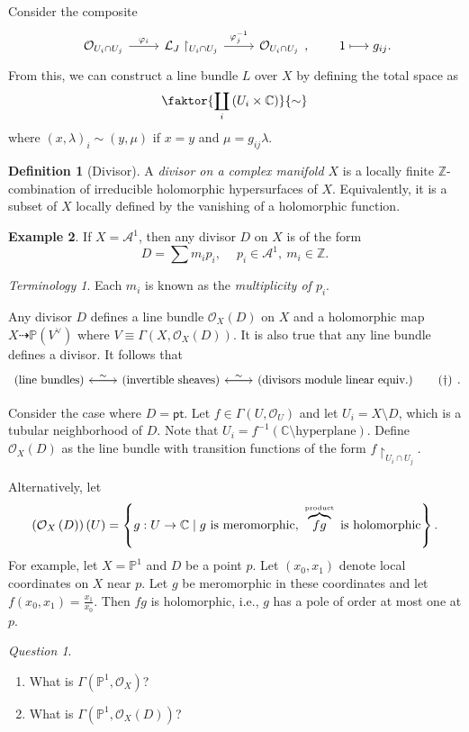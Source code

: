 \documentclass[10pt,letterpaper,cm]{nupset}
\theoremstyle{definition}
\newtheorem{defn}{Definition}[subsection]
\newtheorem{exmp}[defn]{Example}
\theoremstyle{theorem}
\theoremstyle{remark}
\newtheorem*{question}{Question}
\newtheorem*{term}{Terminology}
\newcommand{\A}{\mathcal A}
\newcommand{\C}{\mathbb C}
\renewcommand{\L}{\mathcal L}
\renewcommand{\O}{\mathcal O}
\renewcommand{\P}{\mathbb P}
\newcommand{\Z}{\mathbb Z}
\newcommand{\1}{\mathbb{1}}
\newcommand{\0}{\vec 0}
\newcommand{\pt}{\mathsf{pt}}
\newcommand{\be}{\begin{enumerate}}
\newcommand{\ee}{\end{enumerate}}
\begin{document}
Consider the composite
\[
\begin{tikzcd}
\O_{U_i \cap U_j} \arrow[r, "\varphi_i"] & \L_J\restriction_{U_i \cap U_j} \arrow[r, "\varphi_j^{-1}"] & \O_{U_i \cap U_j}
\end{tikzcd}
, \ \quad \quad 1 \longmapsto g_{ij}.
\] From this, we can construct a line bundle $L$ over $X$ by defining the total space as 
\[
\faktor{\coprod_i\left(U_i \times \C\right)}{\sim}
\] where $\left(x, \lambda \right)_i \sim \left(y, \mu\right)$ if $x=y$ and $\mu = g_{ij}\lambda$. 

\medskip

\begin{defn}[Divisor]
A \textit{divisor on a complex manifold $X$} is a locally finite $\Z$-combination of irreducible holomorphic hypersurfaces of $X$. Equivalently, it is a subset of $X$ locally defined  by the vanishing of a holomorphic function.
\end{defn}

\begin{exmp}
If $X = \A^1$, then any divisor $D$ on $X$ is of the form $$D = \sum m_ip_i, \ \quad p_i \in \A^1, \ m_i \in \Z.$$ 
\end{exmp}

\begin{term}
Each $m_i$ is known as the \textit{multiplicity of $p_i$}.
\end{term}

Any divisor $D$ defines a line bundle $\O_X(D)$ on $X$ and a holomorphic map $X \dashrightarrow \P\left(V^{\vee}\right)$ where $V\equiv \Gamma\left(X, \O_X(D)\right)$. It is also true that any line bundle defines a divisor. It follows that
\[
\begin{tikzcd} 
\label{eqn:corr}
\left(\text{line bundles}\right) \arrow[r] & \left(\text{invertible sheaves}\right) \arrow[l, "\sim"'] \arrow[r] & \left(\text{divisors module linear equiv.}\right) \arrow[l, "\sim"'] \tag{$\dagger$}
\end{tikzcd}.
\]

\medskip

Consider the case where $D = \pt$. Let $f \in \Gamma\left(U, \O_U\right)$ and let $U_i = X \setminus D$, which is a tubular neighborhood of $D$. Note that $U_i = f^{-1}\left (\C\setminus\text{hyperplane}\right)$. Define $\O_X(D)$ as the line bundle with transition functions of the form $f \restriction_{U_i \cap U_j}$.

\medskip

Alternatively, let $$\left(\O_X\left(D\right)\right)\left(U\right) = \left\{g : U \to \C  \mid g \text{ is meromorphic}, \ \overbrace{fg}^{\text{\tiny product}} \text{ is holomorphic}\right\}.$$
For example,
let $X = \P^1$ and $D$ be a point $p$. Let $(x_0, x_1)$ denote local coordinates on $X$ near $p$. Let $g$ be meromorphic in these coordinates and let $f\left(x_0, x_1\right) = \frac{x_1}{x_0}$. Then $f{g}$ is holomorphic, i.e., $g$ has a pole of order at most one at $p$. 
\begin{question} $ $
\be
\item What is $\Gamma\left(\P^1, \O_X\right)$?
\item What is $\Gamma\left(\P^1, \O_X\left(D\right)\right)$?
\ee
\end{question}
\end{document}
